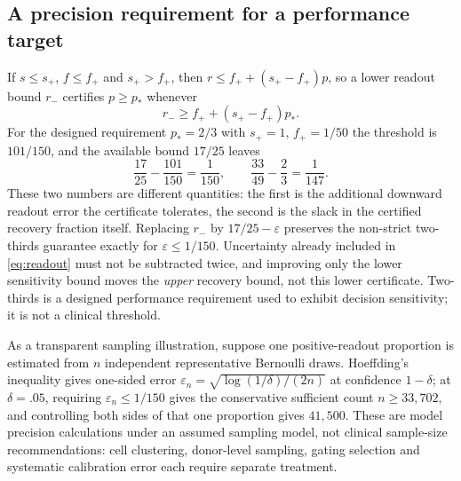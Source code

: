 \documentclass[11pt]{article}
\theoremstyle{definition}
\begin{document}
\subsection{A precision requirement for a performance target}
If $s\le s_+$, $f\le f_+$ and $s_+>f_+$, then $r\le f_++(s_+-f_+)p$, so a
lower readout bound $r_-$ certifies $p\ge p_*$ whenever
\begin{equation}\label{eq:decision}
  r_-\ge f_++(s_+-f_+)p_* .
\end{equation}
For the designed requirement $p_*=2/3$ with $s_+=1$, $f_+=1/50$ the threshold
is $101/150$, and the available bound $17/25$ leaves
\begin{equation}\label{eq:budget}
  \frac{17}{25}-\frac{101}{150}=\frac1{150},\qquad
  \frac{33}{49}-\frac23=\frac1{147}.
\end{equation}
These two numbers are different quantities: the first is the additional
downward readout error the certificate tolerates, the second is the slack in
the certified recovery fraction itself. Replacing $r_-$ by $17/25-\varepsilon$
preserves the non-strict two-thirds guarantee exactly for
$\varepsilon\le1/150$. Uncertainty already included in \eqref{eq:readout} must
not be subtracted twice, and improving only the lower sensitivity bound moves
the \emph{upper} recovery bound, not this lower certificate. Two-thirds is a
designed performance requirement used to exhibit decision sensitivity; it is
not a clinical threshold.

As a transparent sampling illustration, suppose one positive-readout
proportion is estimated from $n$ independent representative Bernoulli draws.
Hoeffding's inequality \cite{hoeffding} gives one-sided error
$\varepsilon_n=\sqrt{\log(1/\delta)/(2n)}$ at confidence $1-\delta$; at
$\delta=.05$, requiring $\varepsilon_n\le1/150$ gives the conservative
sufficient count $n\ge33{,}702$, and controlling both sides of that one
proportion gives $41{,}500$. These are model precision calculations under an
assumed sampling model, not clinical sample-size recommendations: cell
clustering, donor-level sampling, gating selection and systematic calibration
error each require separate treatment.
\end{document}
